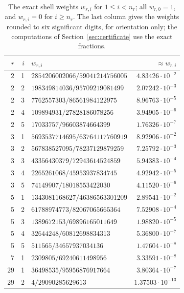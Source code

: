 \documentclass[11pt]{amsart}
\numberwithin{equation}{section}
\theoremstyle{definition}
\theoremstyle{remark}
\begin{document}
\begin{table}[htbp]
\centering\small
\caption{The exact shell weights $w_{r,i}$ for $1\le i<n_r$; all
$w_{r,0}=1$, and $w_{r,i}=0$ for $i\ge n_r$. The last column gives the
weights rounded to six significant digits, for orientation only; the
computations of Section~\ref{sec:certificate} use the exact fractions.}
\label{cert:tab-weights}
\begin{tabular}{rrlr}
\toprule
$r$ & $i$ & $w_{r,i}$ & $\approx w_{r,i}$\\
\midrule
2 & 1 & $2854206002066/59041214756005$ & $4.83426\cdot10^{-2}$\\
2 & 2 & $198349814036/95709219081499$ & $2.07242\cdot10^{-3}$\\
2 & 3 & $7762557303/86561984122975$ & $8.96763\cdot10^{-5}$\\
2 & 4 & $109894931/27828186078256$ & $3.94905\cdot10^{-6}$\\
2 & 5 & $17033757/96603874664399$ & $1.76326\cdot10^{-7}$\\
\midrule
3 & 1 & $5693537714695/63764117760919$ & $8.92906\cdot10^{-2}$\\
3 & 2 & $567838527095/78237129879259$ & $7.25792\cdot10^{-3}$\\
3 & 3 & $43356430379/72943614524859$ & $5.94383\cdot10^{-4}$\\
3 & 4 & $2265261068/45953937834745$ & $4.92942\cdot10^{-5}$\\
3 & 5 & $74149907/18018553422030$ & $4.11520\cdot10^{-6}$\\
\midrule
5 & 1 & $1343081168627/46386563301209$ & $2.89541\cdot10^{-2}$\\
5 & 2 & $61788974773/82067065665364$ & $7.52908\cdot10^{-4}$\\
5 & 3 & $1389672153/69896165011649$ & $1.98820\cdot10^{-5}$\\
5 & 4 & $32644248/60812698834313$ & $5.36800\cdot10^{-7}$\\
5 & 5 & $511565/34657937034136$ & $1.47604\cdot10^{-8}$\\
\midrule
7 & 1 & $2309805/69240611498956$ & $3.33591\cdot10^{-8}$\\
\midrule
29 & 1 & $36498535/95956876917664$ & $3.80364\cdot10^{-7}$\\
29 & 2 & $4/29090285629613$ & $1.37503\cdot10^{-13}$\\
\bottomrule
\end{tabular}
\end{table}
\end{document}
